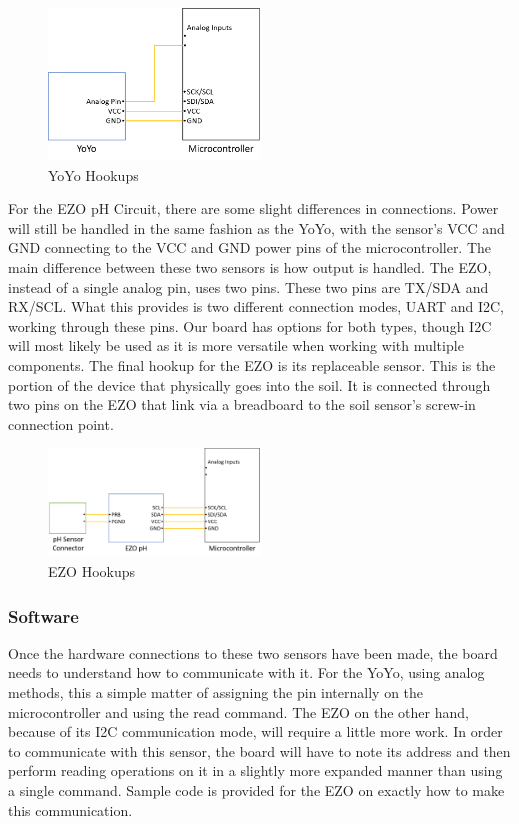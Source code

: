 \documentclass[IEEEtran,letterpaper,10pt,titlepage,fleqn,draftclsnofoot,onecolumn]{article}
\begin{document}
\begin{figure}[H]
  \caption{YoYo Hookups}
  \centering
    \includegraphics[width=0.5\textwidth]
  {yoyo_hookup}
\end{figure}

For the EZO pH Circuit, there are some slight differences in connections. Power will still be handled in the same fashion as the YoYo, with the sensor’s VCC and GND connecting to the VCC and GND power pins of the microcontroller. The main difference between these two sensors is how output is handled. The EZO, instead of a single analog pin, uses two pins. These two pins are TX/SDA and RX/SCL. What this provides is two different connection modes, UART and I2C, working through these pins. Our board has options for both types, though I2C will most likely be used as it is more versatile when working with multiple components. The final hookup for the EZO is its replaceable sensor. This is the portion of the device that physically goes into the soil. It is connected through two pins on the EZO that link via a breadboard to the soil sensor’s screw-in connection point.
\begin{figure}[H]
  \caption{EZO Hookups}
  \centering
    \includegraphics[width=0.5\textwidth]
  {ezo_hookup}
\end{figure}

\subsubsection{Software}

Once the hardware connections to these two sensors have been made, the board needs to understand how to communicate with it. For the YoYo, using analog methods, this a simple matter of assigning the pin internally on the microcontroller and using the read command. The EZO on the other hand, because of its I2C communication mode, will require a little more work. In order to communicate with this sensor, the board will have to note its address and then perform reading operations on it in a slightly more expanded manner than using a single command. Sample code is provided for the EZO on exactly how to make this communication. 
\end{document}
